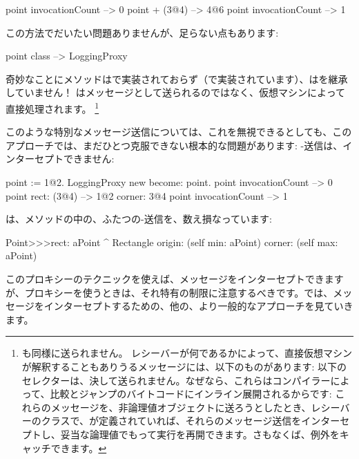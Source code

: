\documentclass[a4paper,10pt,twoside]{book}
\begin{document}
\begin{code}{}
point invocationCount --> 0
point + (3@4)             --> 4@6
point invocationCount --> 1
\end{code}

この方法でだいたい問題ありませんが、足らない点もあります:
\begin{code}{}
point class --> LoggingProxy
\end{code}
奇妙なことにメソッドはで実装されておらず（で実装されています）、はを継承していません！
はメッセージとして送られるのではなく、仮想マシンによって直接処理されます。
\footnote{も同様に送られません。
レシーバーが何であるかによって、直接仮想マシンが解釈することもありうるメッセージには、以下のものがあります:
\ct{+- < > <= >= = ~= * / \ ==}
以下のセレクターは、決して送られません。なぜなら、これらはコンパイラーによって、比較とジャンプのバイトコードにインライン展開されるからです:
これらのメッセージを、非論理値オブジェクトに送ろうとしたとき、レシーバーのクラスで、が定義されていれば、それらのメッセージ送信をインターセプトし、妥当な論理値でもって実行を再開できます。さもなくば、例外をキャッチできます。
}%

このような特別なメッセージ送信については、これを無視できるとしても、このアプローチでは、まだひとつ克服できない根本的な問題があります: \self-送信は、インターセプトできません:
\begin{code}{}
point := 1@2.
LoggingProxy new become: point.
point invocationCount --> 0
point rect: (3@4)        --> 1@2 corner: 3@4
point invocationCount --> 1
\end{code}

は、メソッドの中の、ふたつの\self-送信を、数え損なっています:
\begin{code}{}
Point>>>rect: aPoint 
	^ Rectangle  origin: (self min: aPoint) corner: (self max: aPoint)
\end{code}

このプロキシーのテクニックを使えば、メッセージをインターセプトできますが、プロキシーを使うときは、それ特有の制限に注意するべきです。では、メッセージをインターセプトするための、他の、より一般的なアプローチを見ていきます。
\end{document}
